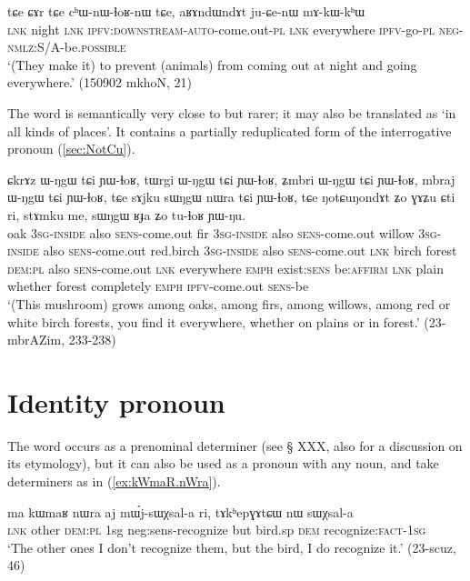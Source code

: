 \begin{exe}
\ex \label{ex:aRAndWndAt.juCenW}
\gll tɕe ɕɤr tɕe cʰɯ-nɯ-ɬoʁ-nɯ tɕe, aʁɤndɯndɤt ju-ɕe-nɯ mɤ-kɯ-kʰɯ \\
\textsc{lnk} night \textsc{lnk} \textsc{ipfv:downstream-auto}-come.out-\textsc{pl} \textsc{lnk} everywhere \textsc{ipfv}-go-\textsc{pl} \textsc{neg}-\textsc{nmlz}:S/A-be.\textsc{possible} \\
\glt `(They make it) to prevent (animals) from coming out at night and going everywhere.' (150902 mkhoN, 21)
\end{exe} 

The word   is semantically very close to  but rarer; it may also be translated as `in all kinds of places'. It contains a partially reduplicated form of the interrogative pronoun  (\ref{sec:NotCu}).

 \begin{exe}
\ex \label{ex:NotCuNondAt}
\gll ɕkrɤz ɯ-ŋgɯ tɕi ɲɯ-ɬoʁ, tɯrgi ɯ-ŋgɯ tɕi ɲɯ-ɬoʁ, ʑmbri ɯ-ŋgɯ tɕi ɲɯ-ɬoʁ,  mbraj ɯ-ŋgɯ tɕi ɲɯ-ɬoʁ, tɕe sɤjku sɯŋgɯ nɯra tɕi ɲɯ-ɬoʁ, tɕe ŋotɕuŋondɤt ʑo ɣɤʑu ɕti ri, stɤmku me, sɯŋgɯ ʁɟa ʑo tu-ɬoʁ ɲɯ-ŋu. \\
oak \textsc{3sg-inside} also \textsc{sens}-come.out fir \textsc{3sg-inside} also \textsc{sens}-come.out willow \textsc{3sg-inside} also \textsc{sens}-come.out red.birch \textsc{3sg-inside} also \textsc{sens}-come.out \textsc{lnk} birch  forest \textsc{dem:pl} also \textsc{sens}-come.out \textsc{lnk} everywhere \textsc{emph} exist:\textsc{sens} be:\textsc{affirm}  \textsc{lnk} plain whether  forest completely \textsc{emph} \textsc{ipfv}-come.out \textsc{sens}-be \\
\glt `(This mushroom) grows among oaks, among firs, among willows, among red or white birch forests, you find it everywhere, whether on plains or in forest.' (23-mbrAZim, 233-238)
\end{exe} 

\section{Identity pronoun} \label{sec:other.pro}
The word  occurs as a prenominal determiner (see § XXX, also for a discussion on its etymology), but it can also be used as a pronoun with any noun, and take determiners as in (\ref{ex:kWmaR.nWra}).

\begin{exe}
\ex \label{ex:kWmaR.nWra}
\gll ma kɯmaʁ nɯra aj mɯ́j-sɯχsal-a ri, tɤkʰepɣɤtɕɯ nɯ sɯχsal-a  \\
\textsc{lnk} other \textsc{dem:pl} 1sg neg:sens-recognize but bird.sp \textsc{dem} recognize:\textsc{fact}-\textsc{1sg} \\
\glt `The other ones I don't recognize them, but the  bird, I do recognize it.' (23-scuz, 46)
\end{exe}

